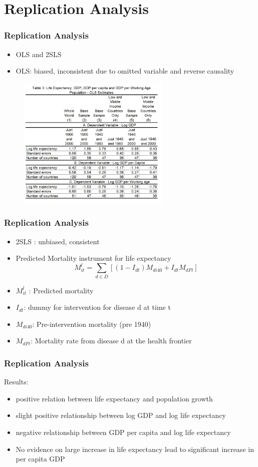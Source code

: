 \documentclass{beamer}
\begin{document}
\section{Replication Analysis} 
\begin{frame}
\frametitle{Replication Analysis} 
\begin{itemize}
\item OLS and 2SLS
\item OLS: biased, inconsistent due to omitted variable and reverse causality
\end{itemize}
\begin{center}
\begin{figure}
\includegraphics[height=2.5in]{table3}
\end{figure}
\end{center}
\end{frame}

\begin{frame}
\frametitle{Replication Analysis} 
\begin{itemize}
\item 2SLS : unbiased, consistent
\item Predicted Mortality instrument for life expectancy 
\begin{equation}
M^{l}_{it} = \sum\limits_{d \in D} [(1-I_{dt})M_{di40}+I_{dt}M_{dFt}]
\end{equation}
\item $M^{l}_{it}$ : Predicted mortality
\item $I_{dt}$: dummy for intervention for disease d at time t
\item $M_{di40}$: Pre-intervention mortality (pre 1940)
\item $M_{dFt}$: Mortality rate from disease d at the health frontier
\end{itemize}
\end{frame}

\begin{frame}
\frametitle{Replication Analysis} 
Results:
\begin{itemize}
\item positive relation between life expectancy and population growth
\item slight positive relationship between log GDP and log life expectancy
\item negative relationship between GDP per capita and log life expectancy
\item No evidence on large increase in life expectancy lead to significant increase in per capita GDP
\end{itemize}
\end{frame}
\end{document}
